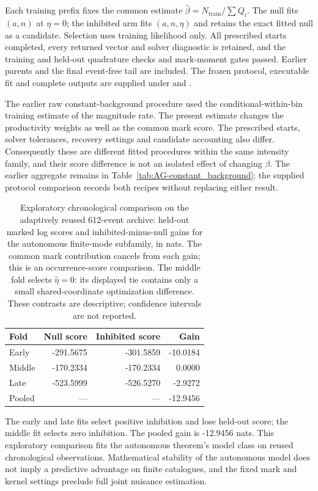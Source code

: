 Each training prefix fixes the common estimate
$\hat\beta=N_{\mathrm{train}}/\sum Q_i$. The null fits $(a,n)$ at $\eta=0$;
the inhibited arm fits $(a,n,\eta)$ and retains the exact fitted null as a
candidate. Selection uses training likelihood only. All prescribed starts
completed, every returned vector and solver diagnostic is retained, and the
training and held-out quadrature checks and mark-moment gates passed.
Earlier parents and the final event-free tail are included. The frozen
protocol, executable fit and complete outputs are supplied under
 and .

The earlier raw constant-background procedure used the conditional-within-bin
training estimate of the magnitude rate. The present estimate changes the
productivity weights as well as the common mark score. The prescribed starts,
solver tolerances, recovery settings and candidate accounting also differ.
Consequently these are different fitted procedures within the same intensity
family, and their score difference is not an isolated effect of changing
$\beta$. The earlier aggregate remains in
Table~\ref{tab:AG-constant_background}; the supplied protocol comparison
records both recipes without replacing either result.


\begin{table}[htbp]
\centering
\small
\begin{tabular}{lrrr}
\toprule
Fold & Null score & Inhibited score & Gain\\
\midrule
Early & -291.5675 & -301.5859 & -10.0184 \\
Middle & -170.2334 & -170.2334 & 0.0000 \\
Late & -523.5999 & -526.5270 & -2.9272 \\
Pooled & --- & --- & -12.9456 \\
\bottomrule
\end{tabular}
\caption{Exploratory chronological comparison on the adaptively reused 612-event archive: held-out marked log scores and inhibited-minus-null gains for the
autonomous finite-mode subfamily, in nats. The common mark contribution
cancels from each gain; this is an occurrence-score comparison. The middle
fold selects $\hat\eta=0$: its displayed tie contains only a small
shared-coordinate optimization difference. These contrasts are descriptive;
confidence intervals are not reported.}
\label{tab:autonomous-nz}
\end{table}

The early and late fits select positive inhibition and lose held-out score;
the middle fit selects zero inhibition. The pooled gain is -12.9456 nats.
This exploratory comparison fits the autonomous theorem's model class on
reused chronological observations. Mathematical stability of the autonomous model does not imply a predictive advantage on finite catalogues,
and the fixed mark and kernel settings preclude full joint nuisance estimation.
